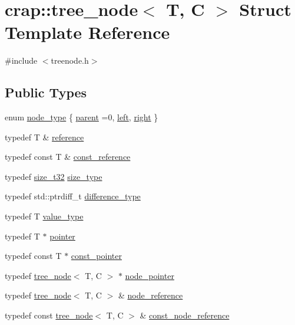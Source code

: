 \hypertarget{structcrap_1_1tree__node}{\section{crap\-:\-:tree\-\_\-node$<$ T, C $>$ Struct Template Reference}
\label{structcrap_1_1tree__node}
}


{\ttfamily \#include $<$treenode.\-h$>$}

\subsection*{Public Types}
\begin{DoxyCompactItemize}
\item 
enum \hyperlink{structcrap_1_1tree__node_a8611158287f75bc048b433c273623e07}{node\-\_\-type} \{ \hyperlink{structcrap_1_1tree__node_a8611158287f75bc048b433c273623e07a80a6e7c4e29c9c73d06921a615da0009}{parent} =0, 
\hyperlink{structcrap_1_1tree__node_a8611158287f75bc048b433c273623e07a7c2127160e28984cb8627a4a580e75bc}{left}, 
\hyperlink{structcrap_1_1tree__node_a8611158287f75bc048b433c273623e07a623e1031d3e83d177e269935a0b7eec5}{right}
 \}
\item 
typedef T \& \hyperlink{structcrap_1_1tree__node_a83b22dd92df6649565abe390e1f96b37}{reference}
\item 
typedef const T \& \hyperlink{structcrap_1_1tree__node_aba72ea30a111f70d4c877614b845289f}{const\-\_\-reference}
\item 
typedef \hyperlink{types_8h_a38c0a12279ffe0fabec44939e753c914}{size\-\_\-t32} \hyperlink{structcrap_1_1tree__node_a78f219a12c6715d77966184e41efc4cd}{size\-\_\-type}
\item 
typedef std\-::ptrdiff\-\_\-t \hyperlink{structcrap_1_1tree__node_a80b30e058eb9e13c85e6fcbc4e37d74e}{difference\-\_\-type}
\item 
typedef T \hyperlink{structcrap_1_1tree__node_a3550078366894313cdaa29f2fe684587}{value\-\_\-type}
\item 
typedef T $\ast$ \hyperlink{structcrap_1_1tree__node_acf5422f2e49c9fbf07f2ffd4f80c5a51}{pointer}
\item 
typedef const T $\ast$ \hyperlink{structcrap_1_1tree__node_a7fec5a80c64002e88a4dd86cbbfa415c}{const\-\_\-pointer}
\item 
typedef \hyperlink{structcrap_1_1tree__node}{tree\-\_\-node}$<$ T, C $>$ $\ast$ \hyperlink{structcrap_1_1tree__node_a66cd96114fc5aaf9806032e15960edc5}{node\-\_\-pointer}
\item 
typedef \hyperlink{structcrap_1_1tree__node}{tree\-\_\-node}$<$ T, C $>$ \& \hyperlink{structcrap_1_1tree__node_a331a31f4a7a022fd6e6a71f834661d7f}{node\-\_\-reference}
\item 
typedef const \hyperlink{structcrap_1_1tree__node}{tree\-\_\-node}$<$ T, C $>$ \& \hyperlink{structcrap_1_1tree__node_aee045bffc92fd3f1d7abc88408b6c582}{const\-\_\-node\-\_\-reference}
\end{DoxyCompactItemize}
